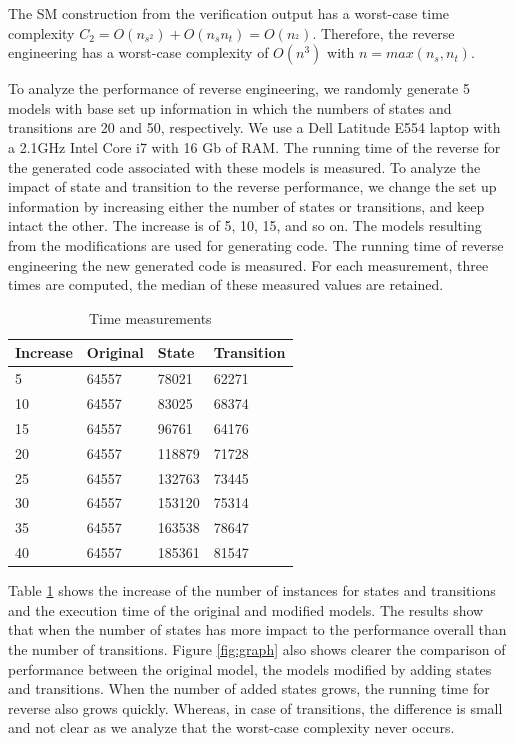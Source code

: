 The SM construction from the verification output has a worst-case time complexity $C_{2} = O (n_{s^2}) + O (n_{s} n_{t}) = O (n_{^2})$. Therefore, the reverse engineering has a worst-case complexity of $O (n^3)$ with $n = max (n_{s}, n_{t})$.

To analyze the performance of reverse engineering, we randomly generate 5 models with base set up information in which the numbers of states and transitions are 20 and 50, respectively. We use a Dell Latitude E554 laptop with a 2.1GHz Intel Core i7 with 16 Gb of RAM. The running time of the reverse for the generated code associated with these models is measured. To analyze the impact of state and transition to the reverse performance, we change the set up information by increasing either the number of states or transitions, and keep intact the other. The increase is of 5, 10, 15, and so on. The models resulting from the modifications are used for generating code. The running time of reverse engineering the new generated code is measured. For each measurement, three times are computed, the median of these measured values are retained. 

\begin{table}
\centering
\caption{Time measurements}
\label{table:time-measurment}
\begin{tabular}{|l|l|l|l|}
\hline
Increase & Original & State  & Transition \\ \hline
5        & 64557    & 78021  & 62271      \\ \hline
10       & 64557    & 83025  & 68374      \\ \hline
15       & 64557    & 96761  & 64176      \\ \hline
20       & 64557    & 118879 & 71728      \\ \hline
25       & 64557    & 132763 & 73445      \\ \hline
30       & 64557    & 153120 & 75314      \\ \hline
35       & 64557    & 163538 & 78647      \\ \hline
40       & 64557    & 185361 & 81547      \\ \hline
\end{tabular}
\end{table}

Table \ref{table:time-measurment} shows the increase of the number of instances for states and transitions and the execution time of the original and modified models. The results show that when the number of states has more impact to the performance overall than the number of transitions. Figure \ref{fig:graph} also shows clearer the comparison of performance between the original model, the models modified by adding states and transitions. When the number of added states grows, the running time for reverse also grows quickly. Whereas, in case of transitions, the difference is small and not clear as we analyze that the worst-case complexity never occurs.


